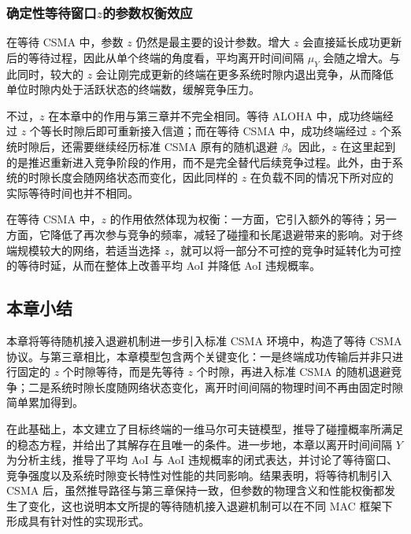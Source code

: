\subsubsection{确定性等待窗口\texorpdfstring{$z$}{z}的参数权衡效应}

在等待 CSMA 中，参数 $z$ 仍然是最主要的设计参数。增大 $z$ 会直接延长成功更新后的等待过程，因此从单个终端的角度看，平均离开时间间隔 $\mu_Y$ 会随之增大。与此同时，较大的 $z$ 会让刚完成更新的终端在更多系统时隙内退出竞争，从而降低单位时隙内处于活跃状态的终端数，缓解竞争压力。

不过，$z$ 在本章中的作用与第三章并不完全相同。等待 ALOHA 中，成功终端经过 $z$ 个等长时隙后即可重新接入信道；而在等待 CSMA 中，成功终端经过 $z$ 个系统时隙后，还需要继续经历标准 CSMA 原有的随机退避 $\beta$。因此，$z$ 在这里起到的是推迟重新进入竞争阶段的作用，而不是完全替代后续竞争过程。此外，由于系统的时隙长度会随网络状态而变化，因此同样的 $z$ 在负载不同的情况下所对应的实际等待时间也并不相同。

在等待 CSMA 中，$z$ 的作用依然体现为权衡：一方面，它引入额外的等待；另一方面，它降低了再次参与竞争的频率，减轻了碰撞和长尾退避带来的影响。对于终端规模较大的网络，若适当选择 $z$，就可以将一部分不可控的竞争时延转化为可控的等待时延，从而在整体上改善平均 AoI 并降低 AoI 违规概率。

\subsection{本章小结}

本章将等待随机接入退避机制进一步引入标准 CSMA 环境中，构造了等待 CSMA 协议。与第三章相比，本章模型包含两个关键变化：一是终端成功传输后并非只进行固定的 $z$ 个时隙等待，而是先等待 $z$ 个时隙，再进入标准 CSMA 的随机退避竞争；二是系统时隙长度随网络状态变化，离开时间间隔的物理时间不再由固定时隙简单累加得到。

在此基础上，本文建立了目标终端的一维马尔可夫链模型，推导了碰撞概率所满足的稳态方程，并给出了其解存在且唯一的条件。进一步地，本章以离开时间间隔 $Y$ 为分析主线，推导了平均 AoI 与 AoI 违规概率的闭式表达，并讨论了等待窗口、竞争强度以及系统时隙变长特性对性能的共同影响。结果表明，将等待机制引入 CSMA 后，虽然推导路径与第三章保持一致，但参数的物理含义和性能权衡都发生了变化，这也说明本文所提的等待随机接入退避机制可以在不同 MAC 框架下形成具有针对性的实现形式。
